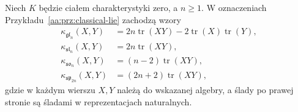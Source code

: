 \begin{twierdzenie}
\label{aa:tw:classical-killing}
Niech $K$ będzie ciałem charakterystyki zero,
a $n\ge1$. W oznaczeniach
Przykładu~\ref{aa:prz:classical-lie} zachodzą wzory
\[
\begin{aligned}
 \kappa_{\mathfrak{gl}_n}(X,Y)&=
  2n\operatorname{tr}(XY)-2\operatorname{tr}(X)\operatorname{tr}(Y),\\
 \kappa_{\mathfrak{sl}_n}(X,Y)&=2n\operatorname{tr}(XY),\\
 \kappa_{\mathfrak{so}_n}(X,Y)&=(n-2)\operatorname{tr}(XY),\\
 \kappa_{\mathfrak{sp}_{2n}}(X,Y)&=(2n+2)\operatorname{tr}(XY),
\end{aligned}
\]
gdzie w każdym wierszu $X,Y$ należą do wskazanej
algebry, a ślady po prawej stronie są śladami
w reprezentacjach naturalnych.
\end{twierdzenie}
